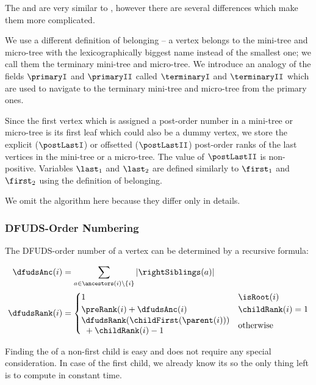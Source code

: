 The \postRank{} and \postSelect{} are very similar to \preAny{}, however there are several differences which make them more complicated.

We use a different definition of belonging -- a vertex belongs to the mini-tree and micro-tree with the lexicographically biggest name instead of the smallest one; we call them the terminary mini-tree and micro-tree.
We introduce an analogy of the fields $\primaryI$ and $\primaryII$ called $\terminaryI$ and $\terminaryII$ which are used to navigate to the terminary mini-tree and micro-tree from the primary ones.

Since the first vertex which is assigned a post-order number in a mini-tree or micro-tree is its first leaf which could also be a dummy vertex, we store the explicit ($\postLastI$) or offsetted ($\postLastII$) post-order ranks of the last vertices in the mini-tree or a micro-tree.
The value of $\postLastII$ is non-positive.
Variables $\last_1$ and $\last_2$ are defined similarly to $\first_1$ and $\first_2$ using the definition of belonging.

We omit the algorithm here because they differ only in details.

\subsubsection{DFUDS-Order Numbering}

\begin{lemma}
	The DFUDS-order number of a vertex can be determined by a recursive formula:

	\begin{align*}
		\dfudsAnc(i) &= \sum_{a \in \ancestors(i) \setminus \{i\}} |\rightSiblings(a)| \\
		\dfudsRank(i) &=
		\begin{cases}
			1 & \isRoot(i) \\
			\preRank(i) + \dfudsAnc(i)  & \childRank(i) = 1 \\
			\!\begin{aligned}
				&\dfudsRank(\childFirst(\parent(i))) \\
				&\ + \childRank(i) - 1
			\end{aligned} & \textotherwise
		\end{cases}
	\end{align*}
\end{lemma}

Finding the \dfudsRank{} of a non-first child is easy and does not require any special consideration.
In case of the first child, we already know its \preRank{} so the only thing left is to compute \dfudsAnc{} in constant time.

